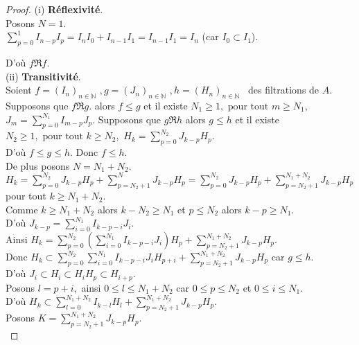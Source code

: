 \begin{proof}
	(i) \textbf{Réflexivité}. \\
	Posons $N=1$. \\
	$\displaystyle \sum_{p=0}^{1}I_{n-p}I_{p}=I_{n}I_{0}+I_{n-1}I_{1}=I_{n-1}I_{1}=I_{n}$ (car $I_{0}\subset I_{1}$).
	
	D'où $f \Re f$. \\
	(ii) \textbf{Transitivité}. \\
	Soient $f=(I_{n})_{n\in \mathbb{N}}$ $,g=(J_{n})_{n\in \mathbb{N}}$ $,h=(H_{n})_{n\in \mathbb{N}}$ \ des filtrations de $A.$ \\
	Supposons que $f \Re g$.
	alors $f\leq g$ et il existe $N_{1}\geq 1,\text{ pour tout } m\geq N_{1},$ $J_{m}=\displaystyle  \sum_{p=0}^{N_{1}}I_{m-p}J_{p}$.
	Supposons que $g \Re h$ alors $g\leq h$ et il existe $N_{2}\geq 1,\text{ pour tout } k\geq N_{2},$ $H_{k}=\displaystyle  \sum_{p=0}^{N_{2}}J_{k-p}H_{p}$.\\
	D'où $f\leq g\leq h.$ Donc $f\leq h$. \\
	De plus posons $N=N_{1}+N_{2}$. \\
	$H_{k}=\displaystyle  \sum_{p=0}^{N_{2}}J_{k-p}H_{p}+\displaystyle  \sum_{p=N_{2}+1}^{N}J_{k-p}H_{p}=\displaystyle  \sum_{p=0}^{N_{2}}J_{k-p}H_{p}+\displaystyle  \sum_{p=N_{2}+1}^{N_{1}+N_{2}}J_{k-p}H_{p}$ pour tout $k\geq N_{1}+N_{2}$. \\
	Comme $k\geq N_{1}+N_{2}$ alors $k-N_{2}\geq N_{1}$ et $p\leq N_{2}$ alors $k-p\geq N_{1}$. \\
	D'où $J_{k-p}=\displaystyle  \sum_{i=0}^{N_{1}}I_{k-p-i}J_{i}$. \\
	Ainsi $H_{k}=\displaystyle  \sum_{p=0}^{N_{2}}(\displaystyle  \sum_{i=0}^{N_{1}}I_{k-p-i}J_{i})H_{p}+\displaystyle  \sum_{p=N_{2}+1}^{N_{1}+N_{2}}J_{k-p}H_{p}$. \\
	Donc $H_{k}\subset \displaystyle  \sum_{p=0}^{N_{2}}\displaystyle  \sum_{i=0}^{N_{1}}I_{k-p-i}J_{i}H_{p+i}+\displaystyle  \sum_{p=N_{2}+1}^{N_{1}+N_{2}}J_{k-p}H_{p}$  car $g\leq h$.\\ D'où $ J_{i}\subset H_{i}\subset H_{i}H_{p}\subset H_{i+p}$. \\
	Posons $l=p+i,$ ainsi $0\leq l\leq N_{1}+N_{2}$ car $0\leq p\leq N_{2}$ et $ 0\leq i\leq N_{1}$. \\
	D'où $H_{k}\subset \displaystyle  \sum_{l=0}^{N_{1}+N_{2}}I_{k-l}H_{l}+\displaystyle  \sum_{p=N_{2}+1}^{N_{1}+N_{2}}J_{k-p}H_{p}$. \\
	Posons $K=\displaystyle  \sum_{p=N_{2}+1}^{N_{1}+N_{2}}J_{k-p}H_{p}$. \\

\end{proof}
